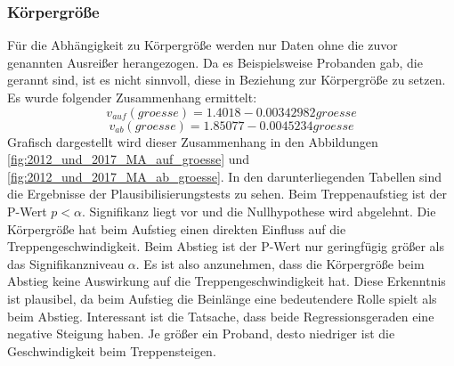\subsubsection{Körpergröße}
Für die Abhängigkeit zu Körpergröße werden nur Daten ohne die zuvor genannten Ausreißer herangezogen. Da es Beispielsweise Probanden gab, die gerannt sind, ist es nicht sinnvoll, diese in Beziehung zur Körpergröße zu setzen. Es wurde folgender Zusammenhang ermittelt:
\begin{equation}
v_{auf}(groesse) = 1.4018 -0.00342982 groesse
\label{eq:2012_2017_AufGroesse_MA}
\end{equation}
\begin{equation}
v_{ab}(groesse) = 1.85077 -0.0045234 groesse
\label{eq:2012_2017_AbGroesse_MA}
\end{equation}
Grafisch dargestellt wird dieser Zusammenhang in den Abbildungen \ref{fig:2012_und_2017_MA_auf_groesse} und \ref{fig:2012_und_2017_MA_ab_groesse}. In den darunterliegenden Tabellen sind die Ergebnisse der Plausibilisierungstests zu sehen. Beim Treppenaufstieg ist der P-Wert $p<\alpha$. Signifikanz liegt vor und die Nullhypothese wird abgelehnt. Die Körpergröße hat beim Aufstieg einen direkten Einfluss auf die Treppengeschwindigkeit. Beim Abstieg ist der P-Wert nur geringfügig größer als das Signifikanzniveau $\alpha$. Es ist also anzunehmen, dass die Körpergröße beim Abstieg keine Auswirkung auf die Treppengeschwindigkeit hat. Diese Erkenntnis ist plausibel, da beim Aufstieg die Beinlänge eine bedeutendere Rolle spielt als beim Abstieg. Interessant ist die  Tatsache, dass beide Regressionsgeraden eine negative Steigung haben. Je größer ein Proband, desto niedriger ist die Geschwindigkeit beim Treppensteigen.

